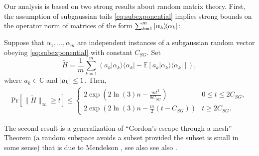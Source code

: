 Our analysis is based on two strong results about random matrix theory. First, the assumption of subgaussian tails \eqref{eq:subexponential} implies strong bounds on the operator norm of matrices of the form $\sum_{k=1}^m \ket{{\alpha_k}}\bra{\alpha_k}$:

\begin{theorem} \label{thm:bernstein}
Suppose that $\alpha_1,\ldots,\alpha_m$ are independent instances of a subgaussian random vector obeying \eqref{eq:subexponential} with constant $C_{SG}$.
Set
\begin{equation}
  \tilde{ H} = \frac{1}{m} \sum_{k=1}^m \left( a_k |\alpha_k \rangle \! \langle \alpha_k| - \mathbb{E} \left[ a_k |\alpha_k \rangle \! \langle \alpha_k| \right] \right),
  \label{eq:Htilde}
\end{equation}
where $a_k \in \mathbb{C}$ and ${\vert a_k\vert} \leq 1$.
Then,
\begin{align}
\mathrm{Pr} \left[ \| \tilde{ H} \|_\infty \geq t \right]
\leq
\begin{cases}
2 \exp \left( 2 \ln (3) n  - \frac{mt^2}{8 C_{SG}} \right) & 0 \leq t \leq 2C_{SG}, \\
2 \exp \left( 2 \ln (3) n - \frac{m}{2} (t- C_{SG} )  \right) & t \geq 2 C_{SG}.
\end{cases}
\end{align}
\end{theorem}


The second result is a generalization of ``Gordon's escape through a mesh''-Theorem \cite{gordon_milman_1988} (a random subspace avoids a subset provided the subset is small in some sense) that is due to Mendelson \cite{mendelson_learning_2015,koltchinskii_bounding_2015}, see also see also \cite{tropp_convex_2015}.

